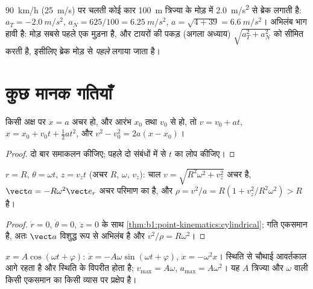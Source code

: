 \begin{example}[मोड़ में ब्रेक]\label{ex:b1:point-kinematics:bend}
\qty{90}{km/h} (\qty{25}{m/s}) पर चलती कोई कार \qty{100}{m} त्रिज्या के मोड़
में \qty{2.0}{m/s^2} से ब्रेक लगाती है: $a_T = \qty{-2.0}{m/s^2}$, $a_N = 625/100 =
\qty{6.25}{m/s^2}$, $a = \sqrt{4 + 39} = \qty{6.6}{m/s^2}$। अभिलंब भाग
हावी है: मोड़ सबसे पहले एक मुड़ना है, और टायरों की पकड़ (अगला अध्याय)
$\sqrt{a_T^2 + a_N^2}$ को सीमित करती है, इसीलिए ब्रेक मोड़ से \emph{पहले}
लगाया जाता है।
\end{example}

\section{कुछ मानक गतियाँ}

\begin{proposition}\label{prop:b1:point-kinematics:uarm}
किसी अक्ष पर $\ddot x = a$ अचर हो, और आरंभ $x_0$ तथा $v_0$ से हो, तो
$v = v_0 + at$, $x = x_0 + v_0t + \tfrac12 at^2$, और
$v^2 - v_0^2 = 2a(x - x_0)$।
\end{proposition}

\begin{proof}
दो बार समाकलन कीजिए; पहले दो संबंधों में से $t$ का लोप कीजिए।
\end{proof}

\begin{proposition}[कुंडलिनी गति]\label{prop:b1:point-kinematics:helix}
$r = R$, $\theta = \omega t$, $z = v_zt$ (अचर $R$, $\omega$, $v_z$): चाल
$v = \sqrt{R^2\omega^2 + v_z^2}$ अचर है, 
$\vect a = -R\omega^2\vect e_r$ अचर परिमाण का  है, और  $\rho = v^2/a = R(1 + v_z^2/R^2\omega^2) > R$ है।
\end{proposition}

\begin{proof}
$\dot r = 0$, $\ddot\theta = 0$, $\ddot z = 0$ के साथ
\cref{thm:b1:point-kinematics:cylindrical}; गति एकसमान है, अतः $\vect a$
विशुद्ध रूप से अभिलंब है और $v^2/\rho = R\omega^2$।
\end{proof}

\begin{proposition}\label{prop:b1:point-kinematics:harmonic}
$x = A\cos(\omega t + \varphi)$: $\dot x = -A\omega\sin(\omega t + \varphi)$,
$\ddot x = -\omega^2 x$।  स्थिति से चौथाई आवर्तकाल आगे रहता है और 
स्थिति के विपरीत होता है; $v_{\max} =
A\omega$, $a_{\max} = A\omega^2$। यह $A$ त्रिज्या और $\omega$ 
वाली किसी एकसमान  का किसी व्यास पर प्रक्षेप है।
\end{proposition}

